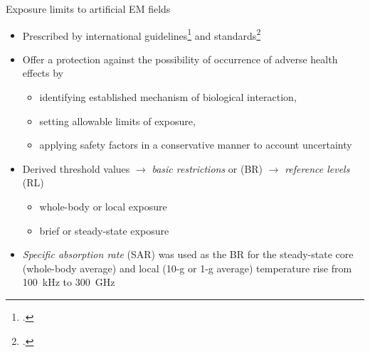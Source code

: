 \documentclass[xcolor=dvipsnames,10pt]{beamer}
\begin{document}
\begin{frame}{Exposure limits to artificial EM fields}
    \begin{itemize}
        \item Prescribed by international guidelines\footcite{ICNIRP2020Guidelines} and standards\footcite{IEEE2019Standard}
        \item Offer a protection against the possibility of occurrence of adverse health effects by
        \begin{itemize}
            \item identifying established mechanism of biological interaction,
            \item setting allowable limits of exposure,
            \item applying safety factors in a conservative manner to account uncertainty
        \end{itemize}
        \item Derived threshold values $\rightarrow$ \emph{basic restrictions} or (BR) $\rightarrow$ \emph{reference levels} (RL)
        \begin{itemize}
            \item whole-body or local exposure
            \item brief or steady-state exposure
        \end{itemize}
        \item \emph{Specific absorption rate} (SAR) was used as the BR for the steady-state core (whole-body average) and local (10-g or 1-g average) temperature rise from \SI{100}{\kHz} to \SI{300}{\GHz}
    \end{itemize}
\end{frame}
\end{document}
